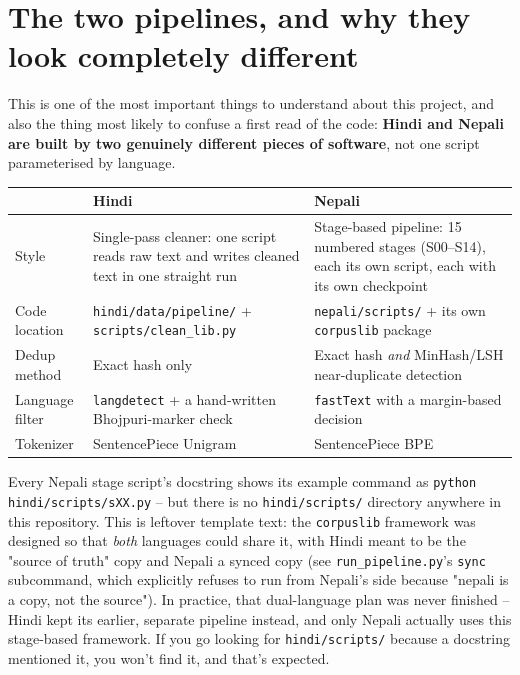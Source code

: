 \documentclass[11pt]{report}
\begin{document}
\section{The two pipelines, and why they look completely different}

This is one of the most important things to understand about this
project, and also the thing most likely to confuse a first read of the
code: \textbf{Hindi and Nepali are built by two genuinely different
pieces of software}, not one script parameterised by language.

\begin{center}
\begin{tabular}{p{4cm}p{5.5cm}p{5.5cm}}
\toprule
& \textbf{Hindi} & \textbf{Nepali} \\
\midrule
Style & Single-pass cleaner: one script reads raw text and writes cleaned
text in one straight run & Stage-based pipeline: 15 numbered stages
(S00--S14), each its own script, each with its own checkpoint \\
Code location & \texttt{hindi/data/pipeline/} + \texttt{scripts/clean\_lib.py} &
\texttt{nepali/scripts/} + its own \texttt{corpuslib} package \\
Dedup method & Exact hash only & Exact hash \textit{and} MinHash/LSH
near-duplicate detection \\
Language filter & \texttt{langdetect} + a hand-written Bhojpuri-marker
check & \texttt{fastText} with a margin-based decision \\
Tokenizer & SentencePiece Unigram & SentencePiece BPE \\
\bottomrule
\end{tabular}
\end{center}

\begin{warnbox}
Every Nepali stage script's docstring shows its example command as
\texttt{python hindi/scripts/sXX.py} -- but there is no
\texttt{hindi/scripts/} directory anywhere in this repository. This is
leftover template text: the \texttt{corpuslib} framework was designed so
that \textit{both} languages could share it, with Hindi meant to be the
"source of truth" copy and Nepali a synced copy (see
\texttt{run\_pipeline.py}'s \texttt{sync} subcommand, which explicitly
refuses to run from Nepali's side because "nepali is a copy, not the
source"). In practice, that dual-language plan was never finished --
Hindi kept its earlier, separate pipeline instead, and only Nepali
actually uses this stage-based framework. If you go looking for
\texttt{hindi/scripts/} because a docstring mentioned it, you won't find
it, and that's expected.
\end{warnbox}
\end{document}
